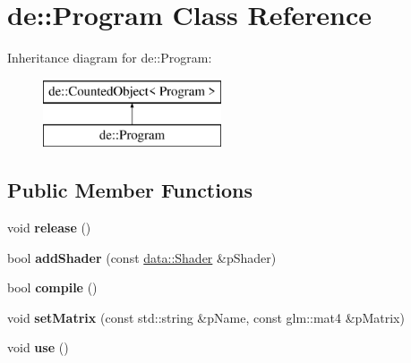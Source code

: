 \hypertarget{classde_1_1_program}{
\section{de\-:\-:\-Program \-Class \-Reference}
\label{classde_1_1_program}
}
\-Inheritance diagram for de\-:\-:\-Program\-:\begin{figure}[H]
\begin{center}
\leavevmode
\includegraphics[height=2.000000cm]{classde_1_1_program}
\end{center}
\end{figure}
\subsection*{\-Public \-Member \-Functions}
\begin{DoxyCompactItemize}
\item 
\hypertarget{classde_1_1_program_ab63d578e8dcbf23be8e8772ae7ae33cb}{
void {\bfseries release} ()}
\label{classde_1_1_program_ab63d578e8dcbf23be8e8772ae7ae33cb}

\item 
\hypertarget{classde_1_1_program_a2dbfa8f7c448de8753e2a07cb67382cf}{
bool {\bfseries add\-Shader} (const \hyperlink{classde_1_1data_1_1_shader}{data\-::\-Shader} \&p\-Shader)}
\label{classde_1_1_program_a2dbfa8f7c448de8753e2a07cb67382cf}

\item 
\hypertarget{classde_1_1_program_a2f4c3aac6f60ceaab0f9cac3ccef51cc}{
bool {\bfseries compile} ()}
\label{classde_1_1_program_a2f4c3aac6f60ceaab0f9cac3ccef51cc}

\item 
\hypertarget{classde_1_1_program_a75bb5fe46cae5e1430b16da5ce2005c4}{
void {\bfseries set\-Matrix} (const std\-::string \&p\-Name, const glm\-::mat4 \&p\-Matrix)}
\label{classde_1_1_program_a75bb5fe46cae5e1430b16da5ce2005c4}

\item 
\hypertarget{classde_1_1_program_aec7c8cae5fea055b26b40299655a1b94}{
void {\bfseries use} ()}
\label{classde_1_1_program_aec7c8cae5fea055b26b40299655a1b94}

\end{DoxyCompactItemize}
